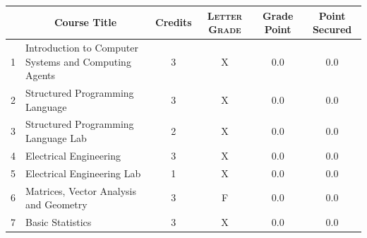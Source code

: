 \documentclass[11pt]{article}
\newcommand*{\numtwo}[1]{\pgfmathprintnumber[
                    fixed, precision=2, fixed zerofill=true]{#1}}
\begin{document}
                \begin{center}
                    \renewcommand{\arraystretch}{1.08}
                    
                \begin{tabular}{|c|l|c|>{\scshape}c|c|c|}
                \hline  \rule[-1ex]{0pt}{3.5ex} {\centering{\bf Course Code}} &  \multicolumn{1}{c|}{\textbf{Course Title}}  & {\bf Credits} & {\bf Letter Grade} & {\bf Grade Point} & {\bf Point Secured}  \\ 
                \hline   1 &  Introduction to Computer Systems and Computing Agents		 & 3 & X & 0.0 & 0.0 \\ %
                \hline   2 &  Structured Programming Language		 & 3 & X & 0.0 & 0.0 \\ %
                \hline   3 &  Structured Programming Language Lab		 & 2 & X & 0.0 & 0.0 \\ %
                \hline   4 &  Electrical Engineering		 & 3 & X & 0.0 & 0.0 \\ %
                \hline   5 &  Electrical Engineering Lab		 & 1 & X & 0.0 & 0.0 \\ %
                \hline   6 &  Matrices, Vector Analysis and Geometry		 & 3 & F & 0.0 & 0.0 \\ %
                \hline   7 &  Basic Statistics		 & 3 & X & 0.0 & 0.0 \\ %

\hline                %
                \end{tabular}
                \end{center}
                \renewcommand{\arraystretch}{1.03}
\end{document}
